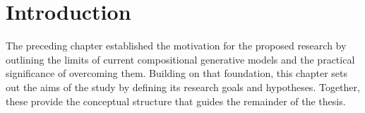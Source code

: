 
\section{Introduction}
\label{sec:research_objectives_introduction}
The preceding chapter established the motivation for the proposed research by outlining the limits of current compositional generative models and the practical significance of overcoming them. Building on that foundation, this chapter sets out the aims of the study by defining its research goals and hypotheses. Together, these provide the conceptual structure that guides the remainder of the thesis.
